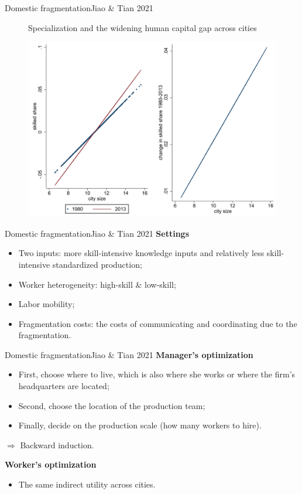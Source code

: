 \documentclass{beamer}
\begin{document}
\begin{frame}{Domestic fragmentation}{Jiao \& Tian 2021}
	\begin{figure}[h]
		\centering
		Specialization and the widening human capital gap across cities

		\includegraphics[scale=0.5]{domestic_fragmentation.png}
	\end{figure}
\end{frame}
\begin{frame}{Domestic fragmentation}{Jiao \& Tian 2021}
	\textbf{Settings}
	\begin{itemize}
		\item Two inputs: more skill-intensive knowledge inputs and relatively less skill-intensive standardized production;
		\item Worker heterogeneity: high-skill \& low-skill;
		\item Labor mobility;
		\item Fragmentation costs: the costs of communicating and coordinating due to the fragmentation.
	\end{itemize}
\end{frame}
\begin{frame}{Domestic fragmentation}{Jiao \& Tian 2021}
	\textbf{Manager’s optimization}
	\begin{itemize}
		\item First, choose where to live, which is also where she works or where the firm's headquarters are located;
		\item Second, choose the location of the production team;
		\item Finally, decide on the production scale (how many workers to hire).
	\end{itemize}
	$\Rightarrow$ Backward induction.
	\medskip

	\textbf{Worker's optimization}
	\begin{itemize}
		\item The same indirect utility across cities.
	\end{itemize}
\end{frame}
\end{document}
